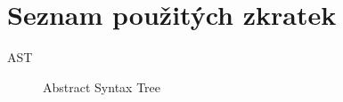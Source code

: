 \chapter{Seznam použitých zkratek}

\begin{description}
\item[AST] Abstract Syntax Tree
\end{description}

